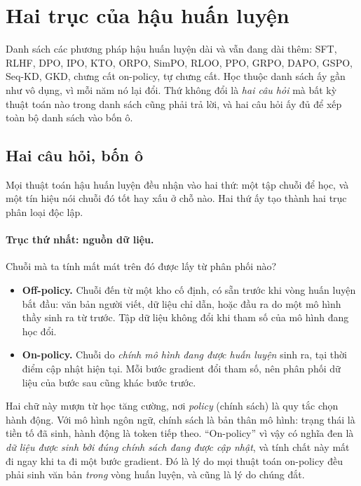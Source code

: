 
\section{Hai trục của hậu huấn luyện}
\label{sec:post_training_axes}

Danh sách các phương pháp hậu huấn luyện dài và vẫn đang dài thêm: SFT, RLHF, DPO, IPO, KTO, ORPO, SimPO, RLOO, PPO, GRPO, DAPO, GSPO, Seq-KD, GKD, chưng cất on-policy, tự chưng cất. Học thuộc danh sách ấy gần như vô dụng, vì mỗi năm nó lại đổi. Thứ không đổi là \emph{hai câu hỏi} mà bất kỳ thuật toán nào trong danh sách cũng phải trả lời, và hai câu hỏi ấy đủ để xếp toàn bộ danh sách vào bốn ô.

\subsection{Hai câu hỏi, bốn ô}
\label{ssec:post_training_quadrants}

Mọi thuật toán hậu huấn luyện đều nhận vào hai thứ: một tập chuỗi để học, và một tín hiệu nói chuỗi đó tốt hay xấu ở chỗ nào. Hai thứ ấy tạo thành hai trục phân loại độc lập.

\paragraph{Trục thứ nhất: nguồn dữ liệu.} Chuỗi mà ta tính mất mát trên đó được lấy từ phân phối nào?
\begin{itemize}
	\item \textbf{Off-policy.} Chuỗi đến từ một kho cố định, có sẵn trước khi vòng huấn luyện bắt đầu: văn bản người viết, dữ liệu chỉ dẫn, hoặc đầu ra do một mô hình thầy sinh ra từ trước. Tập dữ liệu không đổi khi tham số của mô hình đang học đổi.
	\item \textbf{On-policy.} Chuỗi do \emph{chính mô hình đang được huấn luyện} sinh ra, tại thời điểm cập nhật hiện tại. Mỗi bước gradient đổi tham số, nên phân phối dữ liệu của bước sau cũng khác bước trước.
\end{itemize}

Hai chữ này mượn từ học tăng cường, nơi \emph{policy} (chính sách) là quy tắc chọn hành động. Với mô hình ngôn ngữ, chính sách là bản thân mô hình: trạng thái là tiền tố đã sinh, hành động là token tiếp theo. ``On-policy'' vì vậy có nghĩa đen là \emph{dữ liệu được sinh bởi đúng chính sách đang được cập nhật}, và tính chất này mất đi ngay khi ta đi một bước gradient. Đó là lý do mọi thuật toán on-policy đều phải sinh văn bản \emph{trong} vòng huấn luyện, và cũng là lý do chúng đắt.

